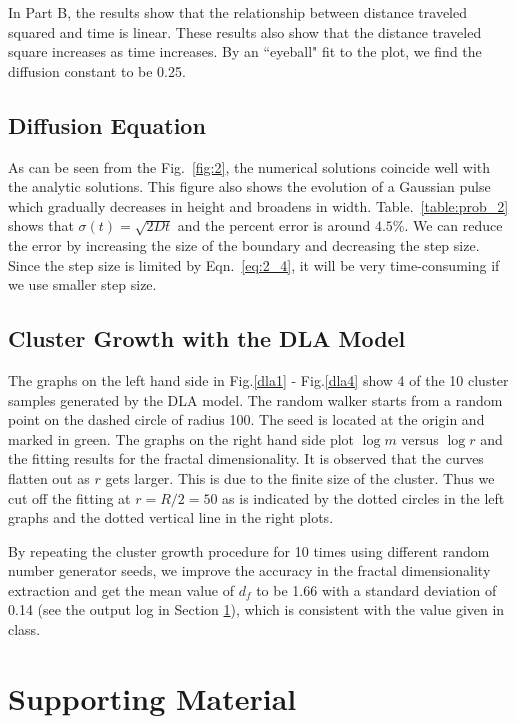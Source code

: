 \documentclass[notitlepage,aps,prd,nofootinbib]{revtex4-1}
\begin{document}
In Part B, the results show that the relationship between distance traveled squared and time is linear. These results also show that the distance traveled square increases as time increases. By an ``eyeball" fit to the plot, we find the diffusion constant to be 0.25.

\subsection{Diffusion Equation}
As can be seen from the Fig.~\eqref{fig:2}, the numerical solutions coincide well with the analytic solutions. This figure also shows the evolution of a Gaussian pulse which gradually decreases in height and broadens in width. Table.~\eqref{table:prob_2} shows that $\sigma(t) = \sqrt{2Dt}$ and the percent error is around $4.5\%$. We can reduce the error by increasing the size of the boundary and decreasing the step size. Since the step size is limited by Eqn.~\eqref{eq:2_4}, it will be very time-consuming if we use smaller step size. 

\subsection{Cluster Growth with the DLA Model}
The graphs on the left hand side in Fig.\ref{dla1} - Fig.\ref{dla4} show 4 of the 10 cluster samples generated by the DLA model. The random walker starts from a random point on the dashed circle of radius 100. The seed is located at the origin and marked in green. The graphs on the right hand side plot $\log m$ versus $\log r$ and the fitting results for the fractal dimensionality. It is observed that the curves flatten out as $r$ gets larger. This is due to the finite size of the cluster. Thus we cut off the fitting at $r = R/2 = 50$ as is indicated by the dotted circles in the left graphs and the dotted vertical line in the right plots. 

By repeating the cluster growth procedure for 10 times using different random number generator seeds, we improve the accuracy in the fractal dimensionality extraction and get the mean value of $d_f$ to be 1.66 with a standard deviation of 0.14 (see the output log in Section \ref{sec:Supporting_Material}), which is consistent with the value given in class.



\clearpage
\section{Supporting Material}
\label{sec:Supporting_Material}
\end{document}
